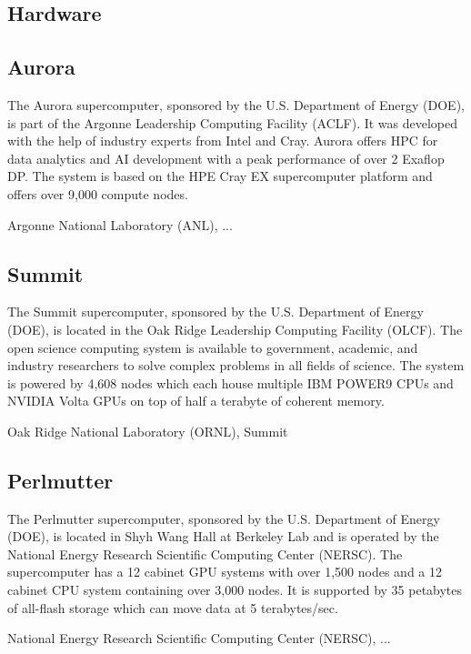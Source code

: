 \documentclass[sigplan,screen]{format/acmart}
\begin{document}
\subsection{Hardware}

\subsection{Aurora}
\label{id:anl} 

The Aurora supercomputer, sponsored by the U.S. Department of Energy (DOE), is part of the Argonne Leadership Computing Facility (ACLF). It was developed with the help of industry experts from Intel and Cray. Aurora offers HPC for data analytics and AI development with a peak performance of over 2 Exaflop DP. The system is based on the HPE Cray EX supercomputer platform and offers over 9,000 compute nodes.

Argonne National Laboratory (ANL), ... \cite{www-aurora}

\subsection{Summit}
\label{id:ornl} 

The Summit supercomputer, sponsored by the U.S. Department of Energy (DOE), is located in the Oak Ridge Leadership Computing Facility (OLCF). The open science computing system is available to government, academic, and industry researchers to solve complex problems in all fields of science. The system is powered by 4,608 nodes which each house multiple IBM POWER9 CPUs and NVIDIA Volta GPUs on top of half a terabyte of coherent memory.

Oak Ridge National Laboratory (ORNL), Summit \cite{www-summit}


\subsection{Perlmutter}
\label{id:nersc} 

The Perlmutter supercomputer, sponsored by the U.S. Department of Energy (DOE), is located in Shyh Wang Hall at Berkeley Lab and is operated by the National Energy Research Scientific Computing Center (NERSC). The supercomputer has a 12 cabinet GPU systems with over 1,500 nodes and a 12 cabinet CPU system containing over 3,000 nodes. It is supported by 35 petabytes of all-flash storage which can move data at 5 terabytes/sec.

National Energy Research Scientific Computing Center (NERSC), ...
\cite{www-perlmutter}
\end{document}
